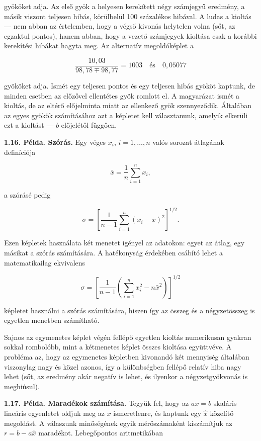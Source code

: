\documentclass[
  magyar,
  11pt]{article}
\begin{document}
gyököket adja. Az első gyök a helyesen kerekített négy számjegyű
eredmény, a másik viszont teljesen hibás, körülbelül 100 százalékos
hibával. A ludas a kioltás --- nem abban az értelemben, hogy a végső
kivonás helytelen volna (sőt, az egzaktul pontos), hanem abban, hogy a
vezető számjegyek kioltása csak a korábbi kerekítési hibákat hagyta meg.
Az alternatív megoldóképlet a

\[\frac{10{,}03}{98{,}78 \mp 98{,}77} = 1003 \quad \text{és} \quad 0{,}05077\]

gyököket adja. Ismét egy teljesen pontos és egy teljesen hibás gyököt
kaptunk, de minden esetben az előzővel ellentétes gyök romlott el. A
magyarázat ismét a kioltás, de az eltérő előjelminta miatt az ellenkező
gyök szennyeződik. Általában az egyes gyökök számításához azt a képletet
kell választanunk, amelyik elkerüli ezt a kioltást --- \(b\) előjelétől
függően.

\textbf{1.16. Példa. Szórás.} Egy véges \(x_i\), \(i = 1, \dots, n\)
valós sorozat átlagának definíciója

\[\bar{x} = \frac{1}{n} \sum_{i=1}^{n} x_i,\]

a szórásé pedig

\[\sigma = \left[ \frac{1}{n-1} \sum_{i=1}^{n} (x_i - \bar{x})^2 \right]^{1/2}.\]

Ezen képletek használata két menetet igényel az adatokon: egyet az
átlag, egy másikat a szórás számítására. A hatékonyság érdekében csábító
lehet a matematikailag ekvivalens

\[\sigma = \left[ \frac{1}{n-1} \left( \sum_{i=1}^{n} x_i^2 - n\bar{x}^2 \right) \right]^{1/2}\]

képletet használni a szórás számítására, hiszen így az összeg és a
négyzetösszeg is egyetlen menetben számítható.

Sajnos az egymenetes képlet végén fellépő egyetlen kioltás numerikusan
gyakran sokkal rombolóbb, mint a kétmenetes képlet összes kioltása
együttvéve. A probléma az, hogy az egymenetes képletben kivonandó két
mennyiség általában viszonylag nagy és közel azonos, így a különbségben
fellépő relatív hiba nagy lehet (sőt, az eredmény akár negatív is lehet,
és ilyenkor a négyzetgyökvonás is meghiúsul).

\textbf{1.17. Példa. Maradékok számítása.} Tegyük fel, hogy az
\(ax = b\) skaláris lineáris egyenletet oldjuk meg az \(x\)
ismeretlenre, és kaptunk egy \(\hat{x}\) közelítő megoldást. A válaszunk
minőségének egyik mérőszámaként kiszámítjuk az \(r = b - a\hat{x}\)
maradékot. Lebegőpontos aritmetikában
\end{document}
